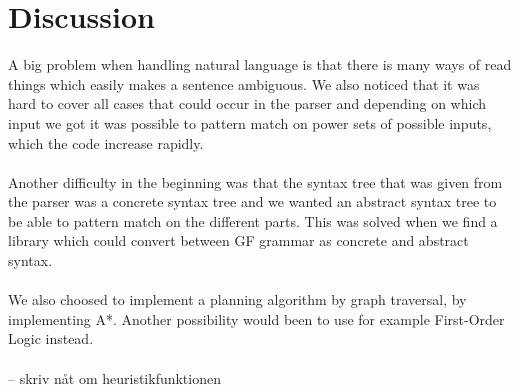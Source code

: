 \section{Discussion}
A big problem when handling natural language is that there is many ways of read things which easily makes a sentence ambiguous. We also noticed that it was hard to cover all cases that could occur in the parser and depending on which input we got it was possible to pattern match on power sets of possible inputs, which the code increase rapidly. \\\\
Another difficulty in the beginning was that the syntax tree that was given from the parser was a concrete syntax tree and we wanted an abstract syntax tree to be able to pattern match on the different parts. This was solved when we find a library which could convert between GF grammar as concrete and abstract syntax. \\\\
We also choosed to implement a planning algorithm by graph traversal, by implementing A*. Another possibility would been to use for example First-Order Logic instead. 
\\\\
-- skriv nåt om heuristikfunktionen
